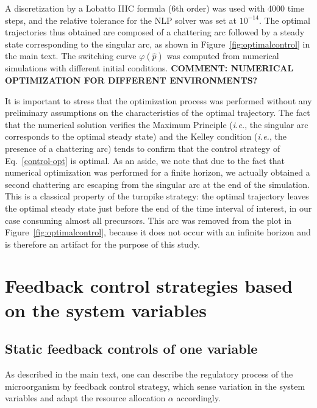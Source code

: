A discretization by a Lobatto IIIC formula (6th order) was used with 4000 time steps, and the relative tolerance for the NLP solver was set at $10^{-14}$.
The optimal trajectories thus obtained are composed of a chattering arc followed by a steady state corresponding to the singular arc, as shown in Figure~\ref{fig:optimalcontrol} in the main text.
The switching curve $\varphi(\hat{p})$ was computed from numerical simulations with different initial conditions. \textbf{COMMENT: NUMERICAL OPTIMIZATION FOR DIFFERENT ENVIRONMENTS?}

It is important to stress that the optimization process was performed without any preliminary assumptions on the characteristics of the optimal trajectory. 
The fact that the numerical solution verifies the Maximum Principle (\textit{i.e.}, the singular arc corresponds to the optimal steady state) and the Kelley condition (\textit{i.e.}, the presence of a chattering arc)
tends to confirm that the control strategy of Eq.~\ref{control-opt} is optimal. As an aside, we note that due to the fact that numerical optimization was performed for a finite horizon, we actually obtained a second chattering arc escaping from the singular arc at the end of the simulation.  This is a classical property of the turnpike strategy: the optimal trajectory leaves the optimal steady state just before the end of the time interval of interest, in our case consuming almost all precursors. This arc was removed from the plot in Figure~\ref{fig:optimalcontrol}, because it does not occur with an infinite horizon and is therefore an artifact for the purpose of this study.

\section{Feedback control strategies based on the system variables}
\label{sec:supp_S4}

\subsection{Static feedback controls of one variable}

As described in the main text, one can describe the regulatory process of the microorganism by feedback control strategy, which sense variation in the system variables and adapt the resource allocation $\alpha$ accordingly.

